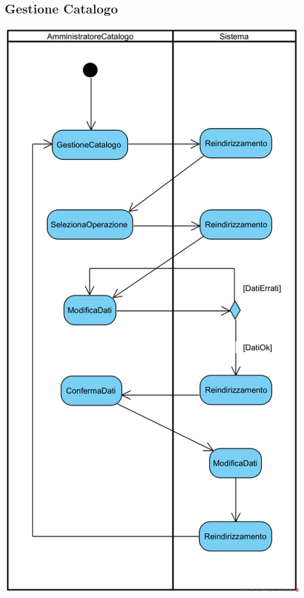 \documentclass[12pt,a4paper]{article}
\begin{document}
\subsection{Gestione Catalogo}
\begin{center}
\includegraphics[height=0.95\textheight]{ActivityDiagram/GestioneCatalogo}
\end{center}
\end{document}
